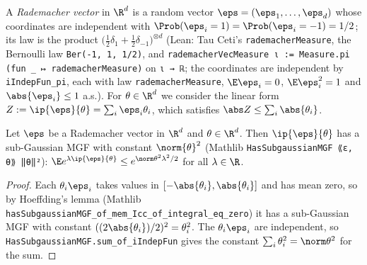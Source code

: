 \begin{definition}\label{def:ps_rademacher}
\leanok
A \emph{Rademacher vector} in $\R^d$ is a random vector $\eps = (\eps_1,\dots,\eps_d)$ whose
coordinates are independent with $\Prob(\eps_i = 1) = \Prob(\eps_i = -1) = 1/2$; its law is the
product $\big(\frac12\delta_{1} + \frac12\delta_{-1}\big)^{\otimes d}$
(Lean: Tau Ceti's \texttt{rademacherMeasure}, the Bernoulli law \texttt{Ber(-1, 1, 1/2)}, and
\texttt{rademacherVecMeasure ι := Measure.pi (fun \_ ↦ rademacherMeasure)} on \texttt{ι → ℝ}; the
coordinates are independent by \texttt{iIndepFun\_pi}, each with law \texttt{rademacherMeasure},
$\E\eps_i = 0$, $\E\eps_i^2 = 1$ and $\abs{\eps_i} \le 1$ a.s.).
For $\theta \in \R^d$ we consider the linear form $Z := \ip{\eps}{\theta} = \sum_i\eps_i\theta_i$,
which satisfies $\abs Z \le \sum_i\abs{\theta_i}$.
\end{definition}

\begin{lemma}\label{lem:rademacher_linear_subgaussian}
\leanok
{}
Let $\eps$ be a Rademacher vector in $\R^d$ and $\theta \in \R^d$. Then $\ip{\eps}{\theta}$ has a
sub-Gaussian MGF with constant $\norm{\theta}^2$ (Mathlib
\texttt{HasSubgaussianMGF ⟪ε, θ⟫ ‖θ‖²}): $\E e^{\lambda\ip{\eps}{\theta}} \le e^{\norm\theta^2\lambda^2/2}$
for all $\lambda\in\R$.
\end{lemma}

\begin{proof}
\leanok
{}
Each $\theta_i\eps_i$ takes values in $[-\abs{\theta_i}, \abs{\theta_i}]$ and has mean zero, so
by Hoeffding's lemma (Mathlib \texttt{hasSubgaussianMGF\_of\_mem\_Icc\_of\_integral\_eq\_zero})
it has a sub-Gaussian MGF with constant $((2\abs{\theta_i})/2)^2 = \theta_i^2$. The
$\theta_i\eps_i$ are independent, so \texttt{HasSubgaussianMGF.sum\_of\_iIndepFun} gives the
constant $\sum_i\theta_i^2 = \norm\theta^2$ for the sum.
\end{proof}

